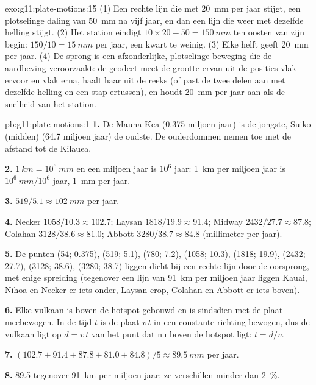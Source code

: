 \begin{solution}{exo:g11:plate-motions:15}
(1) Een rechte lijn die met \qty{20}{mm} per jaar stijgt, een plotselinge daling van
\qty{50}{mm} na vijf jaar, en dan een lijn die weer met dezelfde helling stijgt.
(2) Het station eindigt $10 \times 20 - 50 = \qty{150}{mm}$ ten oosten van zijn begin:
$150/10 = \qty{15}{mm}$ per jaar, een kwart te weinig. (3) Elke helft geeft
\qty{20}{mm} per jaar. (4) De sprong is een afzonderlijke, plotselinge beweging die de
aardbeving veroorzaakt: de geodeet meet de grootte ervan uit de posities vlak ervoor
en vlak erna, haalt haar uit de reeks (of past de twee delen aan met dezelfde
helling en een stap ertussen), en houdt \qty{20}{mm} per jaar aan als de
snelheid van het station.
\end{solution}

\begin{solution}{pb:g11:plate-motions:1}
\textbf{1.} De Mauna Kea (\num{0.375} miljoen jaar) is de jongste, Suiko
(midden) (\num{64.7} miljoen jaar) de oudste. De ouderdommen nemen toe met de
afstand tot de Kilauea.

\textbf{2.} $\qty{1}{km} = 10^6~\unit{mm}$ en een miljoen jaar is $10^6$
jaar: \qty{1}{km} per miljoen jaar is $10^6~\unit{mm}/10^6$ jaar,
\qty{1}{mm} per jaar.

\textbf{3.} $519/5.1 \approx \qty{102}{mm}$ per jaar.

\textbf{4.} Necker $1058/10.3 \approx 102.7$; Laysan $1818/19.9 \approx
91.4$; Midway $2432/27.7 \approx 87.8$; Colahan $3128/38.6 \approx 81.0$;
Abbott $3280/38.7 \approx 84.8$ (millimeter per jaar).

\textbf{5.} De punten (54; 0.375), (519; 5.1), (780; 7.2), (1058; 10.3),
(1818; 19.9), (2432; 27.7), (3128; 38.6), (3280; 38.7) liggen dicht bij een rechte
lijn door de oorsprong, met enige spreiding (tegenover een lijn van \qty{91}{km} per
miljoen jaar liggen Kauai, Nihoa en Necker er iets onder, Laysan erop,
Colahan en Abbott er iets boven).

\textbf{6.} Elke vulkaan is boven de hotspot gebouwd en is sindsdien met de
plaat meebewogen. In de tijd $t$ is de plaat $v\,t$ in een constante
richting bewogen, dus de vulkaan ligt op $d = v\,t$ van het punt dat nu boven de
hotspot ligt: $t = d/v$.

\textbf{7.} $(102.7 + 91.4 + 87.8 + 81.0 + 84.8)/5 \approx \qty{89.5}{mm}$ per
jaar.

\textbf{8.} 89.5 tegenover \qty{91}{km} per miljoen jaar: ze verschillen
minder dan \qty{2}{\percent}.


\end{solution}
